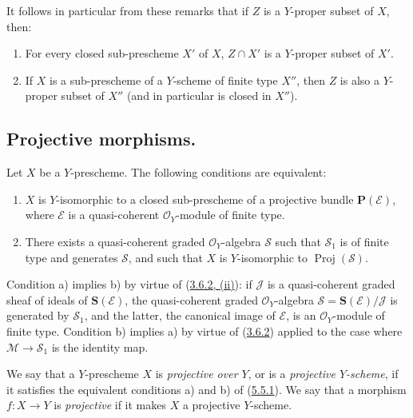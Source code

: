 It follows in particular from these remarks that if $Z$ is a
$Y$-proper subset of $X$, then:
\begin{enumerate}
  \item[\rm{1\textsuperscript{o}}] For every closed sub-prescheme $X'$ of
  $X$, $Z\cap X'$ is a $Y$-proper subset of $X'$.
  \item[\rm{2\textsuperscript{o}}] If $X$ is a sub-prescheme of a
  $Y$-scheme of finite type $X''$, then $Z$ is also a $Y$-proper subset of
  $X''$ (and in particular is closed in $X''$).
\end{enumerate}


\subsection{Projective morphisms.}
\label{subsection:II.5.5}

\begin{proposition}[5.5.1]
\label{II.5.5.1}
Let $X$ be a $Y$-prescheme. The following conditions are equivalent:
\begin{enumerate}
  \item[\rm{a)}] $X$ is $Y$-isomorphic to a closed sub-prescheme of a
  projective bundle $\mathbf{P}(\mathcal{E})$, where $\mathcal{E}$ is a
  quasi-coherent $\mathcal{O}_Y$-module of finite type.
  \item[\rm{b)}] There exists a quasi-coherent graded $\mathcal{O}_Y$-algebra
  $\mathcal{S}$ such that $\mathcal{S}_1$ is of finite type
  and generates $\mathcal{S}$, and such that $X$ is $Y$-isomorphic to
  $\operatorname{Proj}(\mathcal{S})$.
\end{enumerate}
\end{proposition}

Condition a) implies b) by virtue of
(\hyperref[II.3.6.2]{3.6.2, (ii)}): if $\mathcal{J}$ is a quasi-coherent
graded sheaf of ideals of $\mathbf{S}(\mathcal{E})$, the
quasi-coherent graded $\mathcal{O}_Y$-algebra
$\mathcal{S}=\mathbf{S}(\mathcal{E})/\mathcal{J}$ is generated by
$\mathcal{S}_1$, and the latter, the canonical image of $\mathcal{E}$, is an
$\mathcal{O}_Y$-module of finite type. Condition b) implies a) by virtue of
(\hyperref[II.3.6.2]{3.6.2}) applied to the case where
$\mathcal{M}\to\mathcal{S}_1$ is the identity map.


\begin{definition}[5.5.2]
\label{II.5.5.2}
We say that a $Y$-prescheme $X$ is \emph{projective over $Y$}, or is a
\emph{projective $Y$-scheme}, if it satisfies the equivalent conditions a)
and b) of (\hyperref[II.5.5.1]{5.5.1}). We say that a morphism $f:X\to Y$
is \emph{projective} if it makes $X$ a projective $Y$-scheme.
\end{definition}

